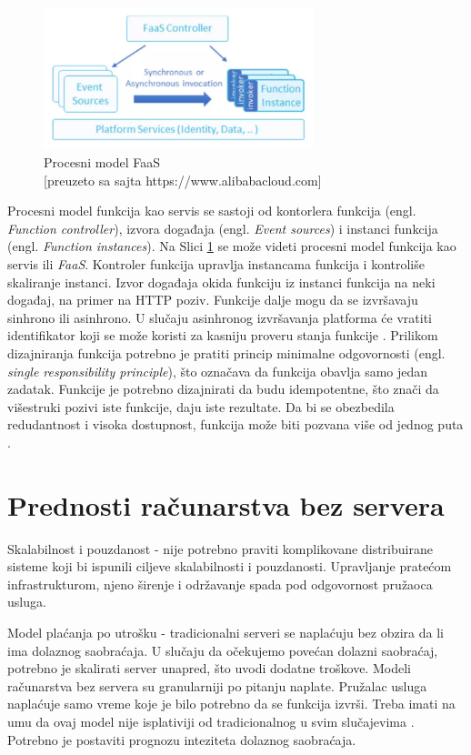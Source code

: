 \documentclass[12pt,oneside]{memoir}
\begin{document}
\begin{figure}[!ht]
  \centering
  \includegraphics[width=0.7\textwidth]{Slika 7.png}
  \caption{Procesni model FaaS\\\footnotesize[preuzeto sa sajta https://www.alibabacloud.com]}
  \label{fig:faasProcesniModel}
\end{figure}


Procesni model funkcija kao servis se sastoji od kontorlera funkcija (engl. \emph{Function controller}), izvora događaja (engl. \emph{Event sources}) i instanci funkcija (engl. \emph{Function instances}). Na Slici \ref{fig:faasProcesniModel} se može videti procesni model funkcija kao servis ili \emph{FaaS}. Kontroler funkcija upravlja instancama funkcija i kontroliše skaliranje instanci. Izvor događaja okida funkciju iz instanci funkcija na neki događaj, na primer na HTTP poziv. Funkcije dalje mogu da se izvršavaju sinhrono ili asinhrono. U slučaju asinhronog izvršavanja platforma će vratiti identifikator koji se može koristi za kasniju proveru stanja funkcije \cite{sah}. Prilikom dizajniranja funkcija potrebno je pratiti princip minimalne odgovornosti (engl. \emph{single responsibility principle}), što označava da funkcija obavlja samo jedan zadatak. Funkcije je potrebno dizajnirati da budu idempotentne, što znači da višestruki pozivi iste funkcije, daju iste rezultate. Da bi se obezbedila redudantnost i visoka dostupnost, funkcija može biti pozvana više od jednog puta \cite{sah}.

\section{Prednosti računarstva bez servera}

Skalabilnost i pouzdanost - nije potrebno praviti komplikovane distribuirane sisteme koji bi ispunili ciljeve skalabilnosti i pouzdanosti. Upravljanje pratećom infrastrukturom, njeno širenje i održavanje spada pod odgovornost pružaoca usluga.

Model plaćanja po utrošku - tradicionalni serveri se naplaćuju bez obzira da li ima dolaznog saobraćaja. U slučaju da očekujemo povećan dolazni saobraćaj, potrebno je skalirati server unapred, što uvodi dodatne troškove. Modeli računarstva bez servera su granularniji po pitanju naplate. Pružalac usluga naplaćuje samo vreme koje je bilo potrebno da se funkcija izvrši. Treba imati na umu da ovaj model nije isplativiji od tradicionalnog u svim slučajevima \cite{sa}. Potrebno je postaviti prognozu inteziteta dolaznog saobraćaja.
\end{document}
